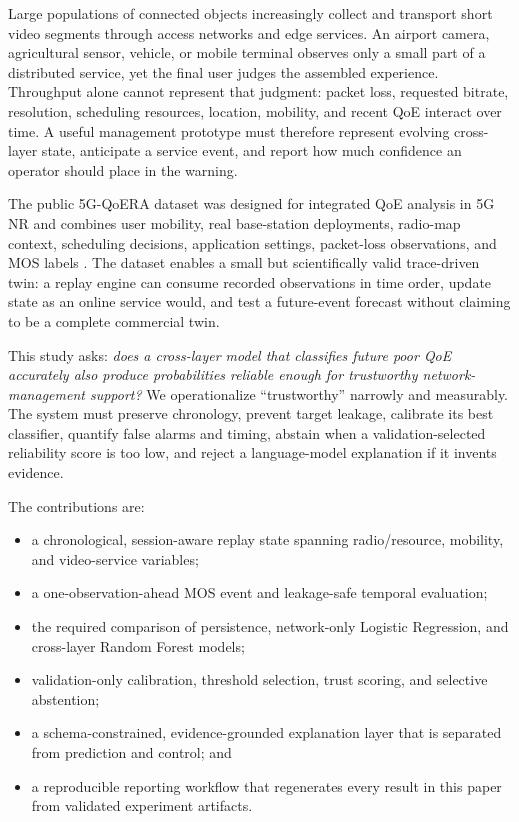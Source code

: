 \documentclass[10pt,conference]{IEEEtran}
\begin{document}
Large populations of connected objects increasingly collect and transport
short video segments through access networks and edge services.  An airport
camera, agricultural sensor, vehicle, or mobile terminal observes only a
small part of a distributed service, yet the final user judges the assembled
experience.  Throughput alone cannot represent that judgment: packet loss,
requested bitrate, resolution, scheduling resources, location, mobility, and
recent QoE interact over time.  A useful management prototype must therefore
represent evolving cross-layer state, anticipate a service event, and report
how much confidence an operator should place in the warning.

The public 5G-QoERA dataset was designed for integrated QoE analysis in 5G NR
and combines user mobility, real base-station deployments, radio-map context,
scheduling decisions, application settings, packet-loss observations, and
MOS labels \cite{boffetti2025qoeira}.  The dataset enables a small but
scientifically valid trace-driven twin: a replay engine can consume recorded
observations in time order, update state as an online service would, and test a
future-event forecast without claiming to be a complete commercial twin.

This study asks: \emph{does a cross-layer model that classifies future poor
QoE accurately also produce probabilities reliable enough for trustworthy
network-management support?}  We operationalize ``trustworthy'' narrowly and
measurably.  The system must preserve chronology, prevent target leakage,
calibrate its best classifier, quantify false alarms and timing, abstain when a
validation-selected reliability score is too low, and reject a language-model
explanation if it invents evidence.

The contributions are:

\begin{itemize}
\item a chronological, session-aware replay state spanning radio/resource,
      mobility, and video-service variables;
\item a one-observation-ahead MOS event and leakage-safe temporal evaluation;
\item the required comparison of persistence, network-only Logistic
      Regression, and cross-layer Random Forest models;
\item validation-only calibration, threshold selection, trust scoring, and
      selective abstention;
\item a schema-constrained, evidence-grounded explanation layer that is
      separated from prediction and control; and
\item a reproducible reporting workflow that regenerates every result in this
      paper from validated experiment artifacts.
\end{itemize}
\end{document}
